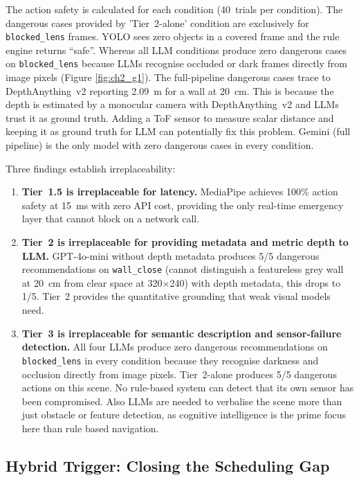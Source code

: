 The action safety is calculated for each condition (40~trials per condition).
The dangerous cases provided by 'Tier~2-alone' condition are exclusively for \texttt{blocked\_lens} frames.
YOLO sees zero objects in a covered frame and the rule engine returns ``safe''. 
Whereas all LLM conditions produce zero dangerous cases on \texttt{blocked\_lens} because LLMs recognise occluded or dark frames directly from image pixels (Figure \ref{fig:ch2_g1}). 
The full-pipeline dangerous cases trace to DepthAnything~v2 reporting 2.09~m for a wall at 20~cm.
This is because the depth is estimated by a monocular camera with DepthAnything~v2 and LLMs trust it as ground truth.
Adding a ToF sensor to measure scalar distance and keeping it as ground truth for LLM can potentially fix this problem.
Gemini (full pipeline) is the only model with zero dangerous cases in every condition.
    
Three findings establish irreplaceability:

\begin{enumerate}
  \item \textbf{Tier~1.5 is irreplaceable for latency.} MediaPipe achieves 100\% action safety at 15~ms with zero API cost, providing the only real-time emergency layer that cannot block on a network call.
  \item \textbf{Tier~2 is irreplaceable for providing metadata and metric depth to LLM.} GPT-4o-mini without depth metadata produces 5/5 dangerous recommendations on \texttt{wall\_close} (cannot distinguish a featureless grey wall at 20~cm from clear space at 320$\times$240) with depth metadata, this drops to 1/5. 
  Tier~2 provides the quantitative grounding that weak visual models need. 
  \item \textbf{Tier~3 is irreplaceable for semantic description and sensor-failure detection.} All four LLMs produce zero dangerous recommendations on \texttt{blocked\_lens} in every condition because they recognise darkness and occlusion directly from image pixels.
  Tier~2-alone produces 5/5 dangerous actions on this scene. 
  No rule-based system can detect that its own sensor has been compromised.
  Also LLMs are needed to verbalise the scene more than just obstacle or feature detection, as cognitive intelligence is the prime focus here than rule based navigation.
\end{enumerate}

\subsection{Hybrid Trigger: Closing the Scheduling Gap}
\label{sec:ch2_g2}

